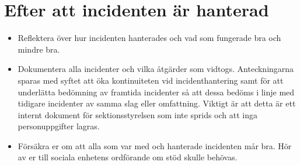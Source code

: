 \section{Efter att incidenten är hanterad}
\begin{itemize}
    \item Reflektera över hur incidenten hanterades och vad som fungerade bra och mindre bra. 
    \item Dokumentera alla incidenter och vilka åtgärder som vidtogs. Anteckningarna sparas med syftet att öka kontinuiteten vid incidenthantering samt för att underlätta bedömning av  framtida incidenter så att dessa bedöms i linje med tidigare incidenter av samma slag eller omfattning. Viktigt är att detta är ett internt dokument för sektionsstyrelsen som inte sprids och att inga personuppgifter lagras.
    \item Försäkra er om att alla som var med och hanterade incidenten mår bra. Hör av er till sociala enhetens ordförande om stöd skulle behövas.
\end{itemize}